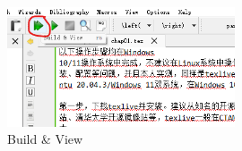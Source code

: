 \begin{figure}[H] 
	\centering
	\includegraphics[width=0.6\textwidth]{image/chap01/f5.png}
	\caption{Build \& View}
	\label{fig:f5}
\end{figure}